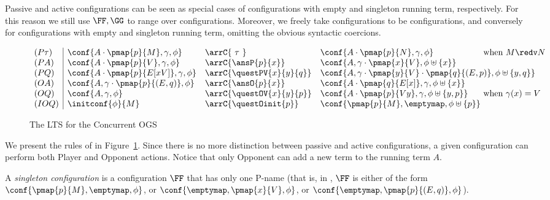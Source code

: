 Passive and active configurations
can be seen as special cases of \COGS configurations with empty and singleton
running term, respectively.
For this reason we still use $\FF, \GG$ to range
over \COGS configurations. Moreover, we freely take  \AOGS
configurations to be  \COGS configurations, 
and conversely for \COGS configurations
with empty and singleton running term, 
omitting the obvious syntactic coercions. 

\begin{figure}
 \[\begin{array}{l|lll@{}l}
   (P\tau) & \conf{A \cdot \pmap{p}{M},\gamma,\phi} & \arrC{\ \tau \ } & 
     \conf{A \cdot \pmap{p}{N},\gamma,\phi} & \text{ when } M \redv N\\
%
   (PA) & \conf{A \cdot \pmap{p}{V},\gamma,\phi} & \arrC{\ansP{p}{x}} & 
     \conf{A,\gamma \cdot \pmap{x}{V},\phi \uplus \{x\}} \\
%
   (PQ) & \conf{A \cdot \pmap{p}{E[xV]},\gamma,\phi} & \arrC{\questPV{x}{y}{q}} & 
     \multicolumn{2}{l}{\conf{A,\gamma \cdot \pmap{y}{V} \cdot \pmap{q}{(E,p)},
     \phi \uplus \{y,q\}}} \\
%
   (OA) & \conf{A,\gamma\cdot\pmap{p}{(E,q)},\phi} & \arrC{\ansO{p}{x}} & 
     \conf{A \cdot \pmap{q}{E[x]},\gamma,\phi \uplus \{x\}} \\
%
   (OQ) & \conf{A,\gamma,\phi} & \arrC{\questOV{x}{y}{p}} & 
     \conf{A \cdot \pmap{p}{V y},\gamma,\phi \uplus \{y,p\}} 
     & \text{ when } \gamma(x) = V\\
   (IOQ) & \initconf{\phi}{M} & \arrC{\questOinit{p}} &
     \conf{\pmap{p}{M},\emptymap,\phi \uplus \{p\}}
  \end{array}\]
\caption{The LTS for the Concurrent OGS}
\label{fig:conc-ogs-lts}
\end{figure}
 
We present the rules of \COGS in Figure~\ref{fig:conc-ogs-lts}.
Since there is no more distinction between passive and active configurations,
a given configuration can perform both %
Player and Opponent actions.
Notice that only Opponent can add a new term to the running term $A$.

A  \emph{singleton configuration} is a configuration $\FF$
that has only one P-name (that is, in \COGS,  $\FF$ is either of the form 
$\conf{\pmap{p}{M},\emptymap,\phi}$, or  
$\conf{\emptymap,\pmap{x}{V},\phi}$, or $\conf{\emptymap,\pmap{p}{(E,q)},\phi}$).

